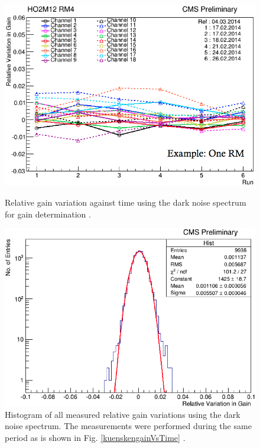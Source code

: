\begin{figure}[h]
\centering
\begin{minipage}[t]{0.475\textwidth}
\includegraphics[width=\textwidth]{Figures/kuensken/gainOverTime.png}
\caption{Relative gain variation against time using the dark noise spectrum for gain determination \cite{kuenskenCalor}.}
\label{kuenskengainVsTime}
\end{minipage}
\hspace{0.5cm}
\begin{minipage}[t]{0.475\textwidth}
\includegraphics[width=\textwidth]{Figures/kuensken/gainTotal.png}
\caption{Histogram of all measured relative gain variations using the dark noise spectrum. The measurements were performed during the same period as is shown in Fig. \ref{kuenskengainVsTime} \cite{kuenskenCalor}.}
\label{kuenskengainHist}
\end{minipage}
\end{figure}
